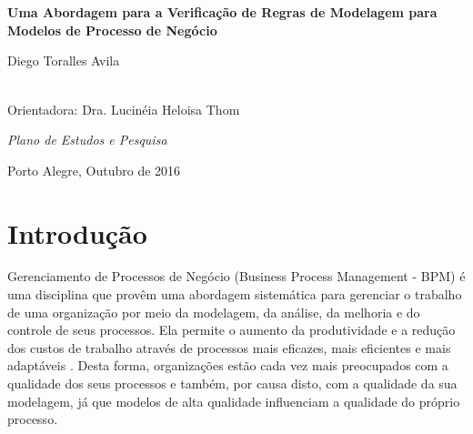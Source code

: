 \documentclass[12pt]{article}
\begin{document}
	
\begin{titlepage}
	\thispagestyle{empty}
	
	\vfill 
	
	
	\begin{center}
		
		\\
		
		
		 \\
		
		\vspace*{2.5cm}
		
		
		\Large{{\bf Uma Abordagem para a Verificação de Regras de Modelagem para Modelos de Processo de Negócio }}
		
		\vspace*{2cm}
		
		
		\Large{Diego Toralles Avila\\ }\\ 
		
		
		\vspace*{1cm}
		
		\normalsize{Orientadora: Dra. Lucinéia Heloisa Thom}
		
		\vspace*{1.5cm}
		\begin{flushright} 
			\parbox[l]{9.3cm}{
				
				\normalsize{\emph{Plano de Estudos e Pesquisa}}}
		\end{flushright}
		\vspace*{2cm}
		
		\large{Porto Alegre, Outubro de 2016}
	\end{center}
\end{titlepage}

\section{Introdução}

Gerenciamento de Processos de Negócio (Business Process Management - BPM) é uma disciplina que provêm uma abordagem sistemática para gerenciar o trabalho de uma organização por meio da modelagem, da análise, da melhoria e do controle de seus processos. Ela permite o aumento da produtividade e a redução dos custos de trabalho através de processos mais eficazes, mais eficientes e mais adaptáveis \cite{aalst:2013}. Desta forma, organizações estão cada vez mais preocupados com a qualidade dos seus  processos e também, por causa disto, com a qualidade da sua modelagem,  já que modelos de alta qualidade influenciam a qualidade do próprio processo.
\end{document}
